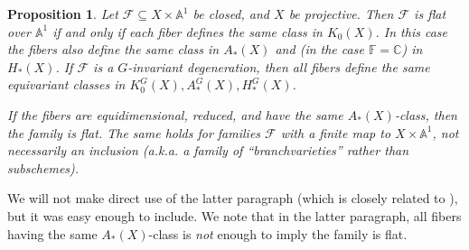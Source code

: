 \documentclass[11pt]{amsart}
\newtheorem{proposition}[Thm]{Proposition}
\theoremstyle{definition}
\newcommand{\CC}{\mathbb{C}}
\def\AA{{\mathbb A }}
\newcommand\FF{{\mathbb F}}
\newcommand\calF{{\mathcal F}}
\renewcommand\AA{{\mathbb A}}
\begin{document}
\begin{proposition}\label{prop:flatness}
  Let $\calF \subseteq X \times \AA^1$ be closed, and $X$ be projective.
  Then $\calF$ is flat over $\AA^1$ if and only if each fiber defines
  the same class in $K_0(X)$. In this case the fibers also define the same
  class in $A_*(X)$ and (in the case $\FF=\CC$) in $H_*(X)$.  
  If $\calF$ is a $G$-invariant degeneration, then all fibers define the same equivariant classes in $K^G_0(X),A_*^G(X),H_*^G(X)$.

  If the fibers are equidimensional, reduced, and have the same $A_*(X)$-class, then the family is flat. The same holds for families $\calF$ with a {\em finite map} to
  $X\times\AA^1$, not necessarily an inclusion
  (a.k.a. a family of ``branchvarieties'' \cite{alexeev2010complete}
  rather than subschemes). 
  
\end{proposition}

We will not make direct use of the latter paragraph (which is closely related to \cite[Lemma 1.7.5]{knutson2005grobner}),
but it was easy enough to include. We note that in the latter paragraph, all fibers having the same $A_*(X)$-class is \emph{not} enough to imply the family is flat.
\end{document}
